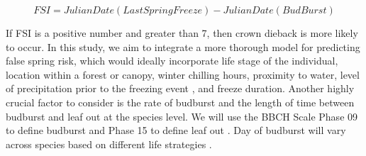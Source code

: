 \documentclass{article}\usepackage[]{graphicx}\usepackage[]{color}
\begin{document}
\[ FSI = Julian Date (Last Spring Freeze) - Julian Date (Bud Burst) \]

If FSI is a positive number and greater than 7, then crown dieback is more likely to occur. In this study, we aim to integrate a more thorough model for predicting false spring risk, which would ideally incorporate life stage of the individual, location within a forest or canopy, winter chilling hours, proximity to water, level of precipitation prior to the freezing event \citep{Anderegg2013}, and freeze duration. Another highly crucial factor to consider is the rate of budburst and the length of time between budburst and leaf out at the species level. We will use the BBCH Scale Phase 09 to define budburst and Phase 15 to define leaf out \citep{Meier2001}.
Day of budburst will vary across species based on different life strategies \citep{Caffarra2011}.
\end{document}
